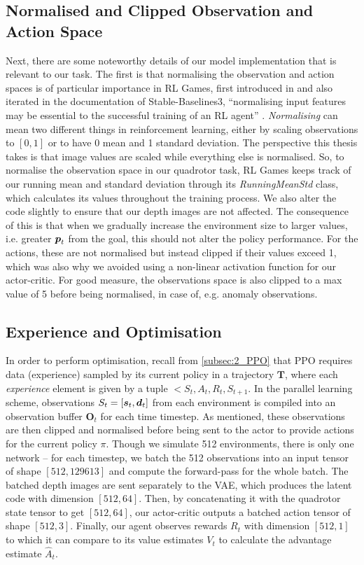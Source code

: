 \subsection{Normalised and Clipped Observation and Action Space}
\label{subsec:6_normalisation}
Next, there are some noteworthy details of our model implementation that is relevant to our task. The first is that normalising the observation and action spaces is of particular importance in RL Games, first introduced in \cite{DDPG} and also iterated in the documentation of Stable-Baselines3, ``normalising input features may be essential to the successful training of an RL agent'' \cite{stable-baselines3}. \textit{Normalising} can mean two different things in reinforcement learning, either by scaling observations to $[0, 1]$ or to have 0 mean and 1 standard deviation. The perspective this thesis takes is that image values are scaled while everything else is normalised.
So, to normalise the observation space in our quadrotor task, RL Games keeps track of our running mean and standard deviation through its \textit{RunningMeanStd} class, which calculates its values throughout the training process. We also alter the code slightly to ensure that our depth images are not affected.
The consequence of this is that when we gradually increase the environment size to larger values, i.e. greater ${\boldsymbol{p}}_t$ from the goal, this should not alter the policy performance. 
For the actions, these are not normalised but instead clipped if their values exceed 1, which was also why we avoided using a non-linear activation function for our actor-critic. For good measure, the observations space is also clipped to a max value of 5 before being normalised, in case of, e.g. anomaly observations.

\subsection{Experience and Optimisation}
\label{subsec:6_experience_optimisation}
In order to perform optimisation, recall from \cref{subsec:2_PPO} that PPO requires data (experience) sampled by its current policy in a trajectory $\boldsymbol{T}$, where each \textit{experience} element is given by a tuple $<S_t, A_t, R_t, S_{t+1}$. In the parallel learning scheme, observations $S_t = [{\boldsymbol{s}}_t, {\boldsymbol{d}}_t]$ from each environment is compiled into an observation buffer $\boldsymbol{O}_t$ for each time timestep. As mentioned, these observations are then clipped and normalised before being sent to the actor to provide actions for the current policy $\pi$. Though we simulate 512 environments, there is only one network -- for each timestep, we batch the 512 observations into an input tensor of shape $[512, 129613]$ and compute the forward-pass for the whole batch. The batched depth images are sent separately to the VAE, which produces the latent code with dimension $[512, 64]$. Then, by concatenating it with the quadrotor state tensor to get $[512, 64]$, our actor-critic outputs a batched action tensor of shape $[512, 3]$. Finally, our agent observes rewards $R_t$ with dimension $[512, 1]$ to which it can compare to its value estimates $V_t$ to calculate the advantage estimate $\hat{A}_t$.

